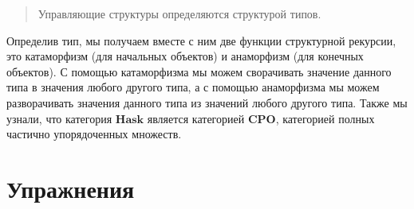 \begin{quote}
Управляющие структуры определяются структурой типов.
\end{quote}

Определив тип, мы получаем вместе с ним две функции структурной
рекурсии, это катаморфизм (для начальных объектов) и анаморфизм (для
конечных объектов). С помощью катаморфизма мы можем сворачивать значение
данного типа в значения любого другого типа, а с помощью анаморфизма мы
можем разворачивать значения данного типа из значений любого другого
типа. Также мы узнали, что категория $\textbf{Hask}$ является категорией
$\textbf{CPO}$, категорией полных частично упорядоченных множеств.

\section{Упражнения}

